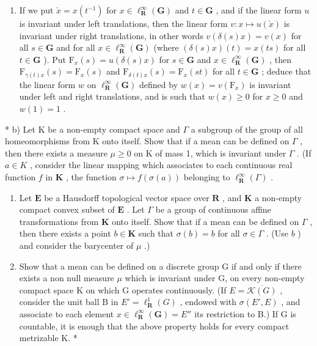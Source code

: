 \begin{enumerate}
\def\labelenumi{\alph{enumi})}
\tightlist
\item
  If we put \(\check{x} = x(t^{-1})\) for \(x\in \ell_{\mathbf{R}}^{\infty}(\mathbf{G})\) and \(t\in \mathbf{G}\) , and if the linear form \(u\) is invariant under left translations, then the linear form \(v:x\mapsto u(\check{x})\) is invariant under right translations, in other words \(v(\delta (s)x) = v(x)\) for all \(s\in \mathbf{G}\) and for all \(x\in \ell_{\mathbf{R}}^{\infty}(\mathbf{G})\) (where \((\delta (s)x)(t) = x(ts)\) for all \(t\in \mathbf{G}\) ). Put \(\mathrm{F}_x(s) = u(\delta (s)x)\) for \(s\in \mathbf{G}\) and \(x\in \ell_{\mathbf{R}}^{\infty}(\mathbf{G})\) , then \(\mathrm{F}_{\gamma (t)x}(s) = \mathrm{F}_x(s)\) and \(\mathrm{F}_{\delta (t)x}(s) = \mathrm{F}_x(st)\) for all \(t\in \mathbf{G}\) ; deduce that the linear form \(w\) on \(\ell_{\mathbf{R}}^{\infty}(\mathbf{G})\) defined by \(w(x) = v(\mathrm{F}_x)\) is invariant under left and right translations, and is such that \(w(x)\geqslant 0\) for \(x\geqslant 0\) and \(w(1) = 1\) .
\end{enumerate}

* b) Let K be a non-empty compact space and \(\Gamma\) a subgroup of the group of all homeomorphisms from K onto itself. Show that if a mean can be defined on \(\Gamma\) , then there exists a measure \(\mu \geqslant 0\) on K of mass 1, which is invariant under \(\Gamma\) . (If \(a \in K\) , consider the linear mapping which associates to each continuous real function \(f\) in \(\mathbf{K}\) , the function \(\sigma \mapsto f(\sigma(a))\) belonging to \(\ell_{\mathbf{R}}^{\infty}(\Gamma)\) .

\begin{enumerate}
\def\labelenumi{\alph{enumi})}
\setcounter{enumi}{2}
\item
  Let \(\mathbf{E}\) be a Hausdorff topological vector space over \(\mathbf{R}\) , and \(\mathbf{K}\) a non-empty compact convex subset of \(\mathbf{E}\) . Let \(\Gamma\) be a group of continuous affine transformations from \(\mathbf{K}\) onto itself. Show that if a mean can be defined on \(\Gamma\) , then there exists a point \(b \in \mathbf{K}\) such that \(\sigma(b) = b\) for all \(\sigma \in \Gamma\) . (Use \(b\) ) and consider the barycenter of \(\mu\) .)
\item
  Show that a mean can be defined on a discrete group G if and only if there exists a non null measure \(\mu\) which is invariant under G, on every non-empty compact space K on which G operates continuously. (If \(E = \overline{\mathcal{K}(G)}\) , consider the unit ball B in \(E' = \ell_{\mathbf{R}}^{1}(G)\) , endowed with \(\sigma(E', E)\) , and associate to each element \(x \in \ell_{\mathbf{R}}^{\infty}(\mathbf{G}) = E''\) its restriction to B.) If G is countable, it is enough that the above property holds for every compact metrizable K. *
\end{enumerate}

